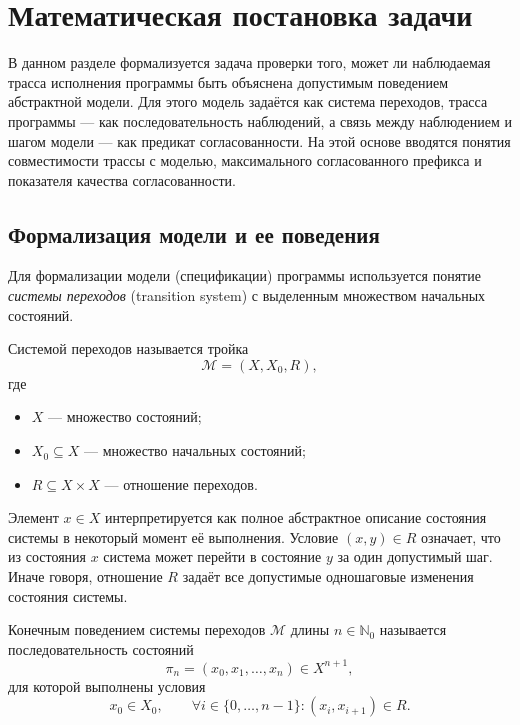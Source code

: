 \section{Математическая постановка задачи}

В данном разделе формализуется задача проверки того, может ли
наблюдаемая трасса исполнения программы быть объяснена допустимым
поведением абстрактной модели. Для этого модель задаётся как система
переходов, трасса программы --- как последовательность наблюдений, а
связь между наблюдением и шагом модели --- как предикат
согласованности. На этой основе вводятся понятия совместимости трассы
с моделью, максимального согласованного префикса и показателя качества
согласованности.

\subsection{Формализация модели и ее поведения}

Для формализации модели (спецификации) программы используется понятие
\emph{системы переходов} (transition system) \cite{Keller1976} с выделенным
множеством начальных состояний.

\begin{definition}\label{def:M}
Системой переходов называется тройка
\begin{equation}\label{f1}
\mathcal{M} = (X, X_0, R),
\end{equation}
где
\begin{itemize}
    \item $X$ --- множество состояний;
    \item $X_0 \subseteq X$ --- множество начальных состояний;
    \item $R \subseteq X \times X$ --- отношение переходов.
\end{itemize}
\end{definition}

Элемент $x \in X$ интерпретируется как полное абстрактное описание состояния
системы в некоторый момент её выполнения. Условие $(x,y) \in R$ означает, что
из состояния $x$ система может перейти в состояние $y$ за один допустимый шаг.
Иначе говоря, отношение $R$ задаёт все допустимые одношаговые изменения
состояния системы.

\begin{definition}
Конечным поведением системы переходов $\mathcal{M}$ длины $n \in \mathbb{N}_0$
называется последовательность состояний
\begin{equation}\label{f2}
\pi_n = (x_0, x_1, \dots, x_n) \in X^{n+1},
\end{equation}
для которой выполнены условия
\[
x_0 \in X_0,
\qquad
\forall i \in \{0,\dots,n-1\} : (x_i,x_{i+1}) \in R.
\]
\end{definition}

